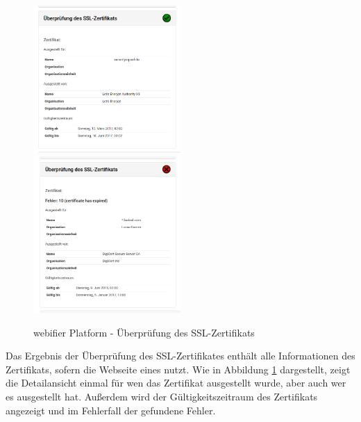 \begin{figure}[H]
\centerline{%
\includegraphics[width=0.5\textwidth]{images/platform/certificatechecker-clean}%
\includegraphics[width=0.5\textwidth]{images/platform/certificatechecker-malicious}%
}%
\caption{webifier Platform - Überprüfung des SSL-Zertifikats}
\label{fig:platform-result-certificatechecker}
\end{figure}

Das Ergebnis der Überprüfung des SSL-Zertifikates enthält alle Informationen des Zertifikats, sofern die Webseite eines nutzt. Wie in Abbildung \ref{fig:platform-result-certificatechecker} dargestellt, zeigt die Detailansicht einmal für wen das Zertifikat ausgestellt wurde, aber auch wer es ausgestellt hat. Außerdem wird der Gültigkeitszeitraum des Zertifikats angezeigt und im Fehlerfall der gefundene Fehler.

